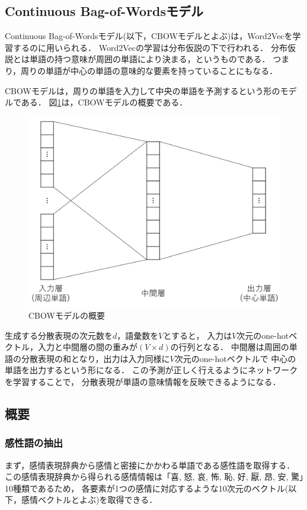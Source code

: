 	\subsection{Continuous Bag-of-Wordsモデル}
	Continuous Bag-of-Wordsモデル\cite{word2vec}(以下，CBOWモデルとよぶ)は，Word2Vecを学習するのに用いられる．
	Word2Vecの学習は分布仮説の下で行われる．
	分布仮説とは単語の持つ意味が周囲の単語により決まる，というものである．
	つまり，周りの単語が中心の単語の意味的な要素を持っていることにもなる．

	CBOWモデルは，周りの単語を入力して中央の単語を予測するという形のモデルである．
	図\ref{fig:CBOW}は，CBOWモデルの概要である．

	\begin{figure}[H]
		\centering
		\includegraphics[width=\linewidth]{./figure/CBOW.png}
		\caption{CBOWモデルの概要}
		\label{fig:CBOW}
	\end{figure}

	生成する分散表現の次元数を$d$，語彙数を$V$とすると，
	入力は$V$次元のone-hotベクトル，入力と中間層の間の重みが$(V \times d)$の行列となる．
	中間層は周囲の単語の分散表現の和となり，出力は入力同様に$V$次元のone-hotベクトルで
	中心の単語を出力するという形になる．
	この予測が正しく行えるようにネットワークを学習することで，
	分散表現が単語の意味情報を反映できるようになる．
	

	\subsection{概要}
		\subsubsection{感性語の抽出}
			まず，感情表現辞典\cite{kanjou_hyogen_jiten}から感情と密接にかかわる単語である感性語を取得する．
			この感情表現辞典から得られる感情情報は「喜, 怒, 哀, 怖, 恥, 好, 厭, 昂, 安, 驚」10種類であるため，
			各要素が1つの感情に対応するような10次元のベクトル(以下，感情ベクトルとよぶ)を取得できる．

